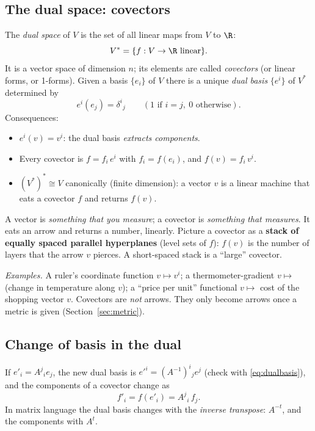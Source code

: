 \subsection{The dual space: covectors}\label{sec:dualspace}

\begin{formal}
The \emph{dual space} of $V$ is the set of all linear maps from $V$ to $\R$:
\[
V^*=\{f:V\to\R\ \text{linear}\}.
\]
It is a vector space of dimension $n$; its elements are called \emph{covectors} (or linear forms, or 1-forms). Given a basis $\{e_i\}$ of $V$ there is a unique \emph{dual basis} $\{e^{i}\}$ of $V^*$ determined by
\begin{equation}\label{eq:dualbasis}
e^{i}(e_j)=\delta^i{}_j\qquad(\text{1 if }i=j,\ 0\text{ otherwise}).
\end{equation}
Consequences:
\begin{itemize}[nosep]
\item $e^{i}(v)=v^i$: the dual basis \emph{extracts components}.
\item Every covector is $f=f_i\,e^{i}$ with $f_i=f(e_i)$, and $f(v)=f_i\,v^i$.
\item $(V^*)^*\cong V$ canonically (finite dimension): a vector $v$ is a linear machine that eats a covector $f$ and returns $f(v)$.
\end{itemize}
\end{formal}

\begin{intuition}
A vector is \emph{something that you measure}; a covector is \emph{something that measures}. It eats an arrow and returns a number, linearly. Picture a covector as a \textbf{stack of equally spaced parallel hyperplanes} (level sets of $f$): $f(v)$ is the number of layers that the arrow $v$ pierces. A short-spaced stack is a ``large'' covector.

\emph{Examples.} A ruler's coordinate function $v\mapsto v^i$; a thermometer-gradient $v\mapsto$ (change in temperature along $v$); a ``price per unit'' functional $v\mapsto$ cost of the shopping vector $v$. Covectors are \emph{not} arrows. They only become arrows once a metric is given (Section~\ref{sec:metric}).
\end{intuition}

\subsection*{Change of basis in the dual}
If $e'_i=A^j{}_ie_j$, the new dual basis is $e'^{i}=(A^{-1})^i{}_je^{j}$ (check with \eqref{eq:dualbasis}), and the components of a covector change as
\begin{equation}\label{eq:covchange}
f'_i=f(e'_i)=A^j{}_i\,f_j .
\end{equation}
In matrix language the dual basis changes with the \emph{inverse transpose}: $A^{-t}$, and the components with $A^{t}$.

